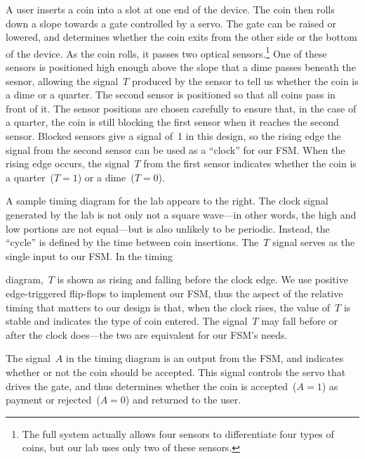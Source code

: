A user inserts a coin into a slot at one end of the device.  The coin
then rolls down a slope towards a gate controlled by a servo.  The gate
can be raised or lowered, and determines whether the coin exits from the
other side or the bottom of the device.
%
As the coin rolls, it passes two optical sensors.\footnote{The full system
actually allows four sensors to differentiate four types of coins, but
our lab uses only two of these sensors.}  One of these sensors is 
positioned high enough above the slope that a dime passes beneath the
sesnor, allowing the signal~$T$ produced by the sensor to tell us whether 
the coin is a dime or a quarter.  The second sensor is positioned so
that all coins pass in front of it.  The sensor positions are chosen 
carefully to ensure that, in the case of a quarter, the coin is still
blocking the first sensor when it reaches the second sensor.  
Blocked sensors give a signal of~1 in this design, so the rising edge 
the signal from the second sensor can be used as a ``clock'' for our 
FSM.  When the rising edge occurs, the signal~$T$ from the first sensor 
indicates whether the coin is a quarter~($T=1$) or a dime~($T=0$).

\begin{minipage}{3.7in}
A sample timing diagram for the lab appears to the right.  The clock
signal generated by the lab is not only not a square wave---in other words,
the high and low portions are not equal---but is also unlikely to be periodic.
Instead, the ``cycle'' is defined by the time between coin insertions.
The~$T$ signal serves as the single input to our FSM.  In the timing\linebreak
\end{minipage}\hspace{0.25in}%
\begin{minipage}{2.55in}
\vspace{12pt}
\end{minipage}\mpdone

diagram,~$T$ is shown as rising and falling before the clock edge.
We use positive edge-triggered flip-flops to implement our FSM,
thus the aspect of the relative timing that matters to our design
is that, when the clock rises, the value of~$T$ is stable and indicates 
the type of coin entered.  The signal~$T$ may fall before or after
the clock does---the two are equivalent for our FSM's needs.

The signal~$A$ in the timing diagram is an output from the FSM, and
indicates whether or not the coin should be accepted.  This signal 
controls the servo that drives the gate, and thus determines whether
the coin is accepted~($A=1$) as payment or rejected~($A=0$) and returned
to the user.  

